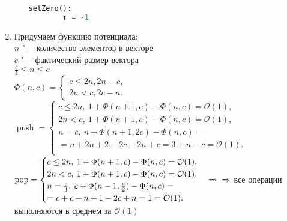 \documentclass[a4paper, 10pt]{article}
\begin{document}
\begin{enumerate}
\begin{enumerate}
\begin{lstlisting}[language=Python]
	setZero():
		r = -1
	\end{lstlisting}
\end{enumerate}

\newpage

\item
\begin{enumerate}
	Придумаем функцию потенциала:\\
	$n$ "--- количество элементов в векторе\\
	$c$ "--- фактический размер вектора \\
	$\frac{c}{4} \leq n \leq c$\\
	$\Phi(n, c) = \begin{cases}
		c \leq 2n, 2n - c,\\
		2n < c, 2c - n.
	\end{cases}$\\
	$\operatorname{push} = \begin{cases}
		c \leq 2n, \medspace 1 + \Phi(n + 1, c) - \Phi(n, c) = \mathcal{O}(1),\\
		2n < c, \medspace 1 + \Phi(n + 1, c) - \Phi(n, c) = \mathcal{O}(1),\\
		n = c, \medspace n + \Phi(n + 1, 2c) - \Phi(n, c) =\\
		= n + 2n + 2 - 2c - 2n + c = 3 + n - c = \mathcal{O}(1).\\
	\end{cases}$\\
	$\operatorname{pop} = \begin{cases}
		c \leq 2n, \medspace 1 + \Phi(n + 1, c) - \Phi(n, c) = \mathcal{O}(1),\\
		2n < c, \medspace 1 + \Phi(n + 1, c) - \Phi(n, c) = \mathcal{O}(1),\\
		n = \frac{c}{4}, \medspace c + \Phi(n - 1, \frac{c}{2}) - \Phi(n, c) =\\
		= c + c - n + 1 - 2c + n = 1 = \mathcal{O}(1).\\
	\end{cases} \Rightarrow \\ \Rightarrow$ все операции выполняются в среднем за $\mathcal{O}(1)$ 
\end{enumerate}


\end{enumerate}
\end{document}
